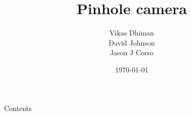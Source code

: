 % 
%

%


\title{Pinhole camera}
\date{\today}
\author{Vikas Dhiman\\ David Johnson\\ Jason J Corso}



\maketitle
\begin{frame}{Contents}
  \tableofcontents
\end{frame}

